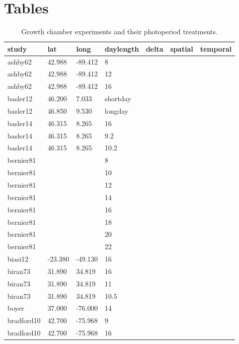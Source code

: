 \documentclass{article}
\begin{document}
\section* {Tables}
\begin{table}[ht]
\centering
\caption{Growth chamber experiments and their photoperiod treatments.} 
\label{table:phototreats}
\begin{tabular}{|p{}|p{}|p{}|p{}|p{}|p{}|p{}|}
  \hline
study & lat & long & daylength & delta & spatial & temporal \\ 
  \hline
ashby62 & 42.988 & -89.412 & 8 &  &  &  \\ 
  ashby62 & 42.988 & -89.412 & 12 &  &  &  \\ 
  ashby62 & 42.988 & -89.412 & 16 &  &  &  \\ 
  basler12 & 46.200 & 7.033 & shortday &  &  &  \\ 
  basler12 & 46.850 & 9.530 & longday &  &  &  \\ 
  basler14 & 46.315 & 8.265 & 16 &  &  &  \\ 
  basler14 & 46.315 & 8.265 & 9.2 &  &  &  \\ 
  basler14 & 46.315 & 8.265 & 10.2 &  &  &  \\ 
  bernier81 &  &  & 8 &  &  &  \\ 
  bernier81 &  &  & 10 &  &  &  \\ 
  bernier81 &  &  & 12 &  &  &  \\ 
  bernier81 &  &  & 14 &  &  &  \\ 
  bernier81 &  &  & 16 &  &  &  \\ 
  bernier81 &  &  & 18 &  &  &  \\ 
  bernier81 &  &  & 20 &  &  &  \\ 
  bernier81 &  &  & 22 &  &  &  \\ 
  biasi12 & -23.380 & -49.130 & 16 &  &  &  \\ 
  biran73 & 31.890 & 34.819 & 16 &  &  &  \\ 
  biran73 & 31.890 & 34.819 & 11 &  &  &  \\ 
  biran73 & 31.890 & 34.819 & 10.5 &  &  &  \\ 
  boyer & 37.000 & -76.000 & 14 &  &  &  \\ 
  bradford10 & 42.700 & -75.968 & 9 &  &  &  \\ 
  bradford10 & 42.700 & -75.968 & 16 &  &  &  \\ 

\end{tabular}
\end{table}
\end{document}
